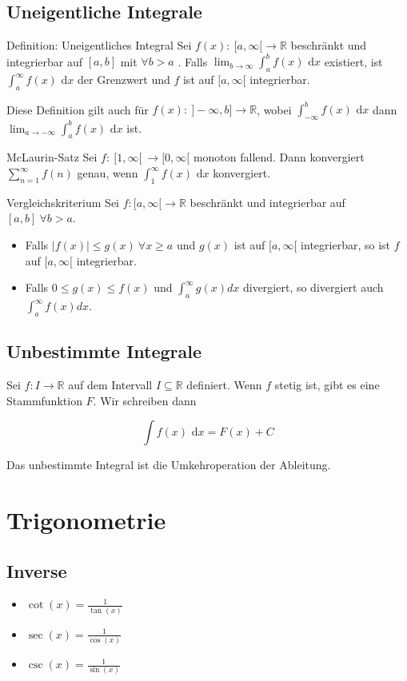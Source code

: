 \documentclass[a4paper,10pt]{article}
\def\R{\mathbb{R}}
\def\dx{\text{ d}x}
\begin{document}
\subsection{Uneigentliche Integrale}
\begin{subbox}{Definition: Uneigentliches Integral}
 Sei $f(x): \ [ a,\infty [ \to \R$ beschränkt und integrierbar auf $[a,b] $ mit $\forall b > a$ . Falls $\lim_{b\to\infty} \int_a^b f(x) \dx$ existiert, ist $\int_a^\infty f(x) \dx$ der Grenzwert und $f$ ist auf $[a, \infty[$ integrierbar.
\end{subbox}
Diese Definition gilt auch für $f(x) : \ ]-\infty,b] \to \R$, wobei $\int_{-\infty}^b f(x) \dx $ dann $ \lim_{a\to-\infty} \int_a^b f(x) \dx$ ist.
\begin{subbox}{McLaurin-Satz}
Sei $f: \ [1, \infty[ \ \to [0, \infty[$ monoton fallend. Dann konvergiert $\sum_{n=1}^\infty f(n)$ genau, wenn $\int_1^\infty f(x) \dx$ konvergiert.
\end{subbox}
\begin{subbox}{Vergleichskriterium}
  Sei $f: [a, \infty[ \to \mathbb{R}$ beschränkt und integrierbar auf $[a, b] \ \forall b > a$.
  \begin{itemize}
    \item Falls $|f(x)| \leq g(x) \ \forall x \geq a$ und $g(x)$ ist auf $[a, \infty[$ integrierbar, so ist $f$ auf $[a, \infty[$ integrierbar.
    \item Falls $0 \leq g(x) \leq f(x)$ und $\int_a^\infty g(x)dx$ divergiert, so divergiert auch $\int_a^\infty f(x)dx$.
  \end{itemize}
\end{subbox}

\subsection{Unbestimmte Integrale}
Sei $f: I \to \R$ auf dem Intervall $I \subseteq \R$ definiert. Wenn $f$ stetig ist, gibt es eine Stammfunktion $F$. Wir schreiben dann

$$\int f(x) \dx = F(x) + C$$

Das unbestimmte Integral ist die Umkehroperation der Ableitung.

\section{Trigonometrie}

\subsection{Inverse}
\begin{itemize}
  \item $\cot(x) = \frac{1}{\tan(x)}$
  \item $\sec(x) = \frac{1}{\cos(x)}$
  \item $\csc(x) = \frac{1}{\sin(x)}$
\end{itemize}
\end{document}
